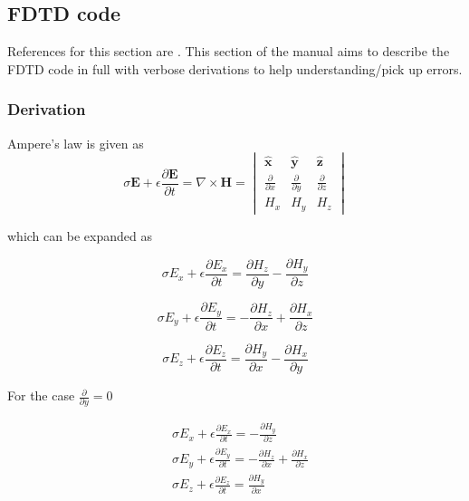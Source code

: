 \subsection{FDTD code}
References for this section are \cite{FDTD_Schneider}. This section of the manual aims to describe the FDTD code in full with verbose derivations to help understanding/pick up errors.
\subsubsection{Derivation}

Ampere’s law is given as  \cite{FDTD_Schneider}
\begin{equation}
\sigma  \boldsymbol{E} + \epsilon \frac{\partial  \boldsymbol{E}}{\partial t} = \nabla \times \boldsymbol{H} =
\begin{vmatrix} \hat{\boldsymbol{x}} & \hat{\boldsymbol{y}} & \hat{\boldsymbol{z}} \\ 
\frac{\partial}{\partial x} & \frac{\partial}{\partial y} & \frac{\partial}{\partial z} \\ 
H_{x} & H_{y} & H_{z}
\end{vmatrix}
\end{equation}


which can be expanded as

\begin{equation}
\sigma  E_{x} + \epsilon \frac{\partial  E_{x}}{\partial t} = \frac{\partial  H_{z}}{\partial y}-\frac{\partial  H_{y}}{\partial z}
\end{equation}

\begin{equation}
\sigma  E_{y} + \epsilon \frac{\partial  E_{y}}{\partial t} = -\frac{\partial  H_{z}}{\partial x}+\frac{\partial  H_{x}}{\partial z}
\end{equation}

\begin{equation}
\sigma  E_{z} + \epsilon \frac{\partial  E_{z}}{\partial t} = \frac{\partial  H_{y}}{\partial x}-\frac{\partial  H_{x}}{\partial y}
\end{equation}


For the case $\frac{\partial}{\partial y}=0$

\begin{equation}
\begin{split}
&\sigma  E_{x} + \epsilon \frac{\partial  E_{x}}{\partial t} =-\frac{\partial  H_{y}}{\partial z}\\
&\sigma  E_{y} + \epsilon \frac{\partial  E_{y}}{\partial t} = -\frac{\partial  H_{z}}{\partial x}+\frac{\partial  H_{x}}{\partial z}\\
&\sigma  E_{z} + \epsilon \frac{\partial  E_{z}}{\partial t} = \frac{\partial  H_{y}}{\partial x}
\end{split}
\end{equation}

